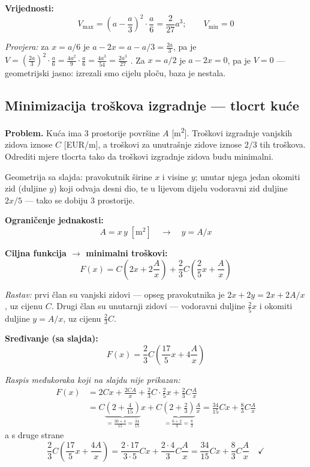 \textbf{Vrijednosti:}
\[
V_{\max} = \left(a - \frac{a}{3}\right)^{2} \cdot \frac{a}{6} = \frac{2}{27}a^3;
\qquad V_{\min} = 0
\]

\emph{Provjera:} za $x = a/6$ je $a - 2x = a - a/3 = \tfrac{2a}{3}$, pa je
$V = \left(\tfrac{2a}{3}\right)^2 \cdot \tfrac{a}{6}
= \tfrac{4a^2}{9}\cdot\tfrac{a}{6} = \tfrac{4a^3}{54} = \tfrac{2a^3}{27}$
\checkmark. Za $x = a/2$ je $a - 2x = 0$, pa je $V = 0$ --- geometrijski jasno:
izrezali smo cijelu ploču, baza je nestala.

\subsection{Minimizacija troškova izgradnje --- tlocrt kuće}

\textbf{Problem.} Kuća ima 3 prostorije površine $A$ [m\textsuperscript{2}].
Troškovi izgradnje vanjskih zidova iznose $C$ [EUR/m], a troškovi za
unutrašnje zidove iznose $2/3$ tih troškova. Odrediti mjere tlocrta tako da
troškovi izgradnje zidova budu minimalni.

Geometrija sa slajda: pravokutnik širine $x$ i visine $y$; unutar njega jedan
okomiti zid (duljine $y$) koji odvaja desni dio, te u lijevom dijelu vodoravni
zid duljine $2x/5$ --- tako se dobiju 3 prostorije.

\textbf{Ograničenje jednakosti:}
\[
A = x\,y \; [\text{m}^2] \quad \to \quad y = A/x
\]

\textbf{Ciljna funkcija $\to$ minimalni troškovi:}
\[
F(x) = C\left(2x + 2\frac{A}{x}\right)
     + \frac{2}{3}C\left(\frac{2}{5}x + \frac{A}{x}\right)
\]

\emph{Rastav:} prvi član su vanjski zidovi --- opseg pravokutnika je
$2x + 2y = 2x + 2A/x$, uz cijenu $C$. Drugi član su unutarnji zidovi ---
vodoravni duljine $\tfrac{2}{5}x$ i okomiti duljine $y = A/x$, uz cijenu
$\tfrac{2}{3}C$.

\textbf{Sređivanje (sa slajda):}
\[
F(x) = \frac{2}{3}C\left(\frac{17}{5}x + 4\frac{A}{x}\right)
\]

\emph{Raspis međukoraka koji na slajdu nije prikazan:}
\begin{align}
F(x) &= 2Cx + \frac{2CA}{x} + \frac{2}{3}C \cdot \frac{2}{5}x
        + \frac{2}{3}C\frac{A}{x} \\
     &= C\underbrace{\left(2 + \frac{4}{15}\right)}_{=\frac{30+4}{15}=\frac{34}{15}}x
      + C\underbrace{\left(2 + \frac{2}{3}\right)}_{=\frac{6+2}{3}=\frac{8}{3}}\frac{A}{x}
      = \frac{34}{15}Cx + \frac{8}{3}C\frac{A}{x}
\end{align}
a s druge strane
\[
\frac{2}{3}C\left(\frac{17}{5}x + \frac{4A}{x}\right)
= \frac{2 \cdot 17}{3 \cdot 5}Cx + \frac{2\cdot 4}{3}C\frac{A}{x}
= \frac{34}{15}Cx + \frac{8}{3}C\frac{A}{x} \quad \checkmark
\]

